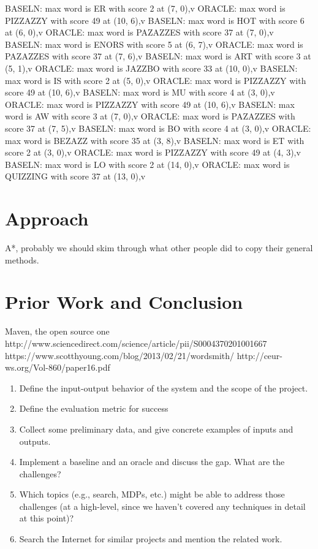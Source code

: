 \documentclass[12pt]{article}
\begin{document}
BASELN: max word is ER with score 2 at (7, 0),v
ORACLE: max word is PIZZAZZY with score 49 at (10, 6),v
BASELN: max word is HOT with score 6 at (6, 0),v
ORACLE: max word is PAZAZZES with score 37 at (7, 0),v
BASELN: max word is ENORS with score 5 at (6, 7),v
ORACLE: max word is PAZAZZES with score 37 at (7, 6),v
BASELN: max word is ART with score 3 at (5, 1),v
ORACLE: max word is JAZZBO with score 33 at (10, 0),v
BASELN: max word is IS with score 2 at (5, 0),v
ORACLE: max word is PIZZAZZY with score 49 at (10, 6),v
BASELN: max word is MU with score 4 at (3, 0),v
ORACLE: max word is PIZZAZZY with score 49 at (10, 6),v
BASELN: max word is AW with score 3 at (7, 0),v
ORACLE: max word is PAZAZZES with score 37 at (7, 5),v
BASELN: max word is BO with score 4 at (3, 0),v
ORACLE: max word is BEZAZZ with score 35 at (3, 8),v
BASELN: max word is ET with score 2 at (3, 0),v
ORACLE: max word is PIZZAZZY with score 49 at (4, 3),v
BASELN: max word is LO with score 2 at (14, 0),v
ORACLE: max word is QUIZZING with score 37 at (13, 0),v

\section*{Approach}
A*, probably we should skim through what other people did to copy their general methods.

\section*{Prior Work and Conclusion}
Maven, the open source one
http://www.sciencedirect.com/science/article/pii/S0004370201001667
https://www.scotthyoung.com/blog/2013/02/21/wordsmith/
http://ceur-ws.org/Vol-860/paper16.pdf

\begin{enumerate}[label=(\roman*)]
  \item  Define the input-output behavior of the system and the scope of the project.
  \item  Define the evaluation metric for success
  \item  Collect some preliminary data, and give concrete examples of inputs and outputs.
  \item  Implement a baseline and an oracle and discuss the gap. What are the challenges?
  \item Which topics (e.g., search, MDPs, etc.) might be able to address those challenges (at a high-level, since we haven't covered any techniques in detail at this point)?
  \item  Search the Internet for similar projects and mention the related work.
\end{enumerate}
\end{document}
